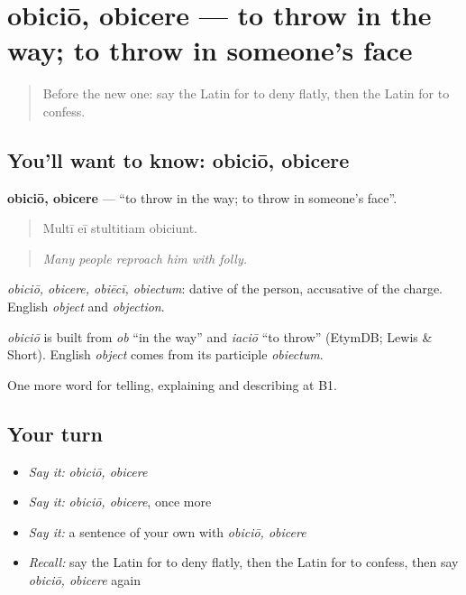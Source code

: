 \section[obiciō, obicere]{obiciō, obicere — to throw in the way; to throw in someone's face}

\label{lesson:LA-C363-obicio}



\begin{quote}
Before the new one: say the Latin for to deny flatly, then the Latin for to confess.
\end{quote}

\subsection*{You'll want to know: obiciō, obicere}
\textbf{obiciō, obicere} — \textquotedblleft{}to throw in the way; to throw in someone's face\textquotedblright{}.

\begin{quote}
Multī eī stultitiam obiciunt.
\end{quote}

\begin{quote}
\emph{Many people reproach him with folly.}
\end{quote}

\emph{obiciō, obicere, obiēcī, obiectum}: dative of the person, accusative of the charge. English \emph{object} and \emph{objection}.

\begin{cousinweb}
\emph{obiciō} is built from \emph{ob} \textquotedblleft{}in the way\textquotedblright{} and \emph{iaciō} \textquotedblleft{}to throw\textquotedblright{} (EtymDB; Lewis \& Short). English \emph{object} comes from its participle \emph{obiectum}.
\end{cousinweb}

\begin{grammarlens}[title={What you've built}]
One more word for telling, explaining and describing at B1.
\end{grammarlens}

\subsection*{Your turn}
\begin{itemize}
\raggedright
  \item \emph{Say it:} \emph{obiciō, obicere}
  \item \emph{Say it:} \emph{obiciō, obicere}, once more
  \item \emph{Say it:} a sentence of your own with \emph{obiciō, obicere}
  \item \emph{Recall:} say the Latin for to deny flatly, then the Latin for to confess, then say \emph{obiciō, obicere} again
\end{itemize}


